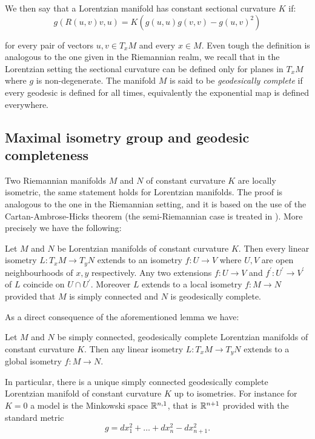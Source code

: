 \noindent We then say that a Lorentzian manifold has constant sectional curvature $K$ if: 
\begin{equation}\label{sectionalcurvature}
    g(R(u,v)v,u)=K(g(u,u)g(v,v)-g(u,v)^2) 
\end{equation}
    


for every pair of vectors $u,v \in T_{x}M$ and every $x\in M$. Even tough the definition is analogous to the one given in the Riemannian realm, we recall that in the Lorentzian setting the sectional curvature can be defined only for planes in $T_{x}M$ where $g$ is non-degenerate. The manifold $M$ is said to be \textit{geodesically complete} if every geodesic is defined for all times, equivalently the exponential map is defined everywhere.\\

\subsection{Maximal isometry group and geodesic completeness} Two Riemannian manifolds $M$ and $N$ of constant curvature $K$ are locally isometric, the same statement holds for Lorentzian manifolds. The proof is analogous to the one in the Riemannian setting, and it is based on the use of the Cartan-Ambrose-Hicks theorem (the semi-Riemannian case is treated in \cite{piccione2005single}). More precisely we have the following:

\begin{lemma}\label{isometrie} Let $M$ and $N$ be Lorentzian manifolds of constant curvature $K$. Then every linear isometry $L:T_{x}M\to T_yN$ extends to an isometry $f:U\to V$ where $U, V$ are open neighbourhoods of $x, y$ respectively. Any two extensions $f:U\to V$ and $f^{\prime}:U^{\prime} \to V^{\prime} $ of $L$ coincide on $U\cap U^{\prime}. $ Moreover $L$ extends to a local isometry $f:M\to N$ provided that $M$ is simply connected and $N$ is geodesically complete. 
\end{lemma}

As a direct consequence of the aforementioned lemma we have: 
\begin{corollary}\label{122}
    Let $M$ and $N$ be simply connected, geodesically complete Lorentzian manifolds of constant curvature $K$. Then any linear isometry $L:T_xM\to T_yN$ extends to a global isometry $f:M\to N.$   
\end{corollary}

In particular, there is a unique simply connected geodesically complete Lorentzian manifold of constant curvature $K$ up to isometries. For instance for $K=0$ a model is the Minkowski space $\mathbb{R}^{n,1}$, that is $\mathbb{R}^{n+1}$ provided with the standard metric
\[
    g=dx_1^{2}+\dots+dx_n^{2}-dx_{n+1}^2.   
\]

